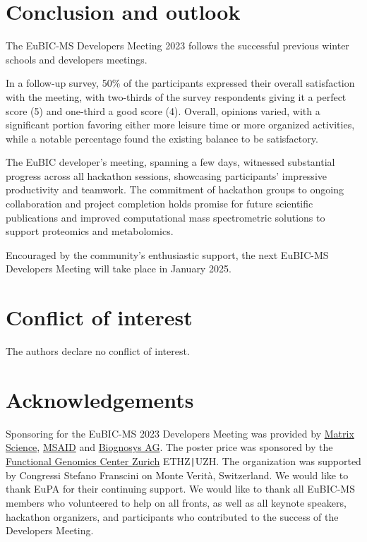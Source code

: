\section{Conclusion and outlook}
The EuBIC-MS Developers Meeting 2023 follows the successful previous winter schools and developers meetings.

In a follow-up survey, 50\% of the participants expressed their overall satisfaction with the meeting, with two-thirds of the survey respondents giving it a perfect score (5) and one-third a good score (4).
Overall, opinions varied, with a significant portion favoring either more leisure time or more organized activities, while a notable percentage found the existing balance to be satisfactory.
    
The EuBIC developer's meeting, spanning a few days, witnessed substantial progress across all hackathon sessions, showcasing participants' impressive productivity and teamwork. The commitment of hackathon groups to ongoing collaboration and project completion holds promise for future scientific publications and improved computational mass spectrometric solutions to support proteomics and metabolomics.

Encouraged by the community's enthusiastic support, the next EuBIC-MS Developers Meeting will take place in January 2025.
 
\section{Conflict of interest}
The authors declare no conflict of interest.
 
\section{Acknowledgements}
Sponsoring for the EuBIC-MS 2023 Developers Meeting was provided by \href{https://www.matrixscience.com/}{Matrix Science}, \href{https://www.msaid.de/}{MSAID} and \href{https://biognosys.com/}{Biognosys AG}. The poster price was sponsored by the \href{https://fgcz.ch}{Functional Genomics Center Zurich} ETHZ\texttt{|}UZH. The organization was supported by Congressi Stefano Franscini on Monte Verità, Switzerland. We would like to thank EuPA for their continuing support. We would like to thank all EuBIC-MS members who volunteered to help on all fronts, as well as all keynote speakers, hackathon organizers, and participants who contributed to the success of the Developers Meeting.

